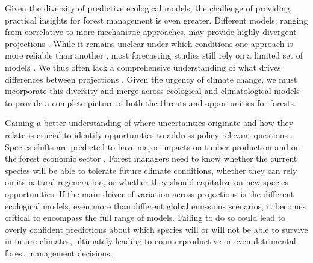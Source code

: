 \documentclass[11pt,letter]{article}
\begin{document}
Given the diversity of predictive ecological models, the challenge of providing practical insights for forest management is even greater. Different models, ranging from correlative to more mechanistic approaches, may provide highly divergent projections \citep{Morin2009, Keenan2011a, Cheaib2012, Takolander2019}. While it remains unclear under which conditions one approach is more reliable than another \citep{VanderMeersch2024}, most forecasting studies still rely on a limited set of models \citep{Dyderski2018, Wessely2024, Hanewinkel2013, Schueler2014}. We thus often lack a comprehensive understanding of what drives differences between projections \citep{Simmonds2024}. Given the urgency of climate change, we must incorporate this diversity and merge across ecological and climatological models to provide a complete picture of both the threats and opportunities for forests. 

Gaining a better understanding of where uncertainties originate and how they relate is crucial to identify opportunities 
to address policy-relevant questions \citep{Urban2016}. Species shifts are predicted to have major impacts on timber production and on the forest economic sector \citep{Wessely2024, Hanewinkel2013}. Forest managers need to know whether the current species will be able to tolerate future climate conditions, whether they can rely on its natural regeneration, or whether they should capitalize on new species opportunities. If the main driver of variation across projections is the different ecological models, even more than different global emissions scenarios, it becomes critical to encompass the full range of models. Failing to do so could lead to overly confident predictions about which species will or will not be able to survive in future climates, ultimately leading to counterproductive or even detrimental forest management decisions.
\end{document}
